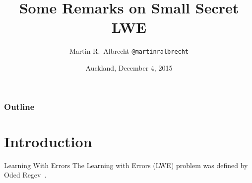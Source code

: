 \documentclass[10pt,compress]{beamer}
\title{Some Remarks on Small Secret LWE}
\author[Martin R.\ Albrecht]{Martin R.\ Albrecht \texttt{@martinralbrecht}}
\institute{Information Security Group, Royal Holloway, University of London}
\date{Auckland, December 4, 2015}
\begin{document}
 

\begin{frame}
  \maketitle
\end{frame}

\setcounter{tocdepth}{2}
\begin{frame}
  \frametitle{Outline}
  \tableofcontents
\end{frame}


\section{Introduction}

\begin{frame}{Learning With Errors}
  The Learning with Errors (LWE) problem was defined by Oded Regev~. 


\end{frame}
\end{document}
